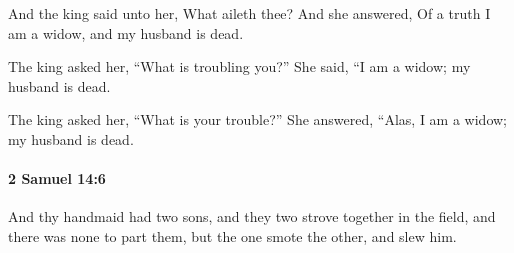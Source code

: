			\begin{versebox}
					\item[BHS] 
					\item[ASV] And the king said unto her, What aileth thee? And she answered, Of a truth I am a widow, and my husband is dead.
					\item[NIV] The king asked her, “What is troubling you?” She said, “I am a widow; my husband is dead.
					\item[NRSV] The king asked her, “What is your trouble?” She answered, “Alas, I am a widow; my husband is dead.
			\end{versebox}

		\paragraph{2 Samuel 14:6} %
			\label{2SAMUEL-14-6}

			And thy handmaid had two sons, and they two strove together in the field, and there was none to part them, but the one smote the other, and slew him.

